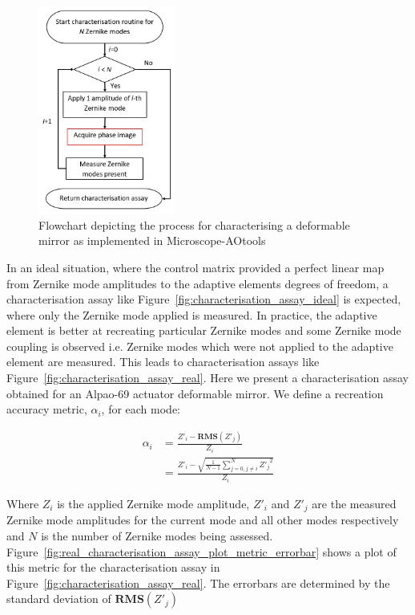 \begin{figure}[h]
	\centering
	\includegraphics[width=0.4\textwidth, scale=0.5]{./images/characterisation_workflow.jpg}
	\caption{Flowchart depicting the process for characterising a deformable mirror as implemented in Microscope-AOtools}
	\label{fig:characterisation_workflow}
\end{figure}

In an ideal situation, where the control matrix provided a perfect linear map from Zernike mode amplitudes to the adaptive elements degrees of freedom, a characterisation assay like Figure~\ref{fig:characterisation_assay_ideal} is expected, where only the Zernike mode applied is measured. In practice, the adaptive element is better at recreating particular Zernike modes and some Zernike mode coupling is observed i.e. Zernike modes which were not applied to the adaptive element are measured. This leads to characterisation assays like Figure~\ref{fig:characterisation_assay_real}. Here we present a characterisation assay obtained for an Alpao-69 actuator deformable mirror. We define a recreation accuracy metric, $\alpha_{i}$, for each mode:

\begin{equation}\label{eq:recreation_accuracy}
\begin{split}
\alpha_{i} &= \frac{Z'_{i} - \boldsymbol{RMS}(Z'_{j})}{Z_{i}} \\
&= \frac{Z'_{i} - \sqrt{\frac{1}{N-1}\sum_{j=0,j\ne i}^{N} {Z'_{j}}^{2}}}{Z_{i}}
\end{split}
\end{equation}

Where $Z_{i}$ is the applied Zernike mode amplitude, $Z'_{i}$ and $Z'_{j}$ are the measured Zernike mode amplitudes for the current mode and all other modes respectively and $N$ is the number of Zernike modes being assessed. Figure~\ref{fig:real_characterisation_assay_plot_metric_errorbar} shows a plot of this metric for the characterisation assay in Figure~\ref{fig:characterisation_assay_real}. The errorbars are determined by the standard deviation of $\boldsymbol{RMS}(Z'_{j})$

